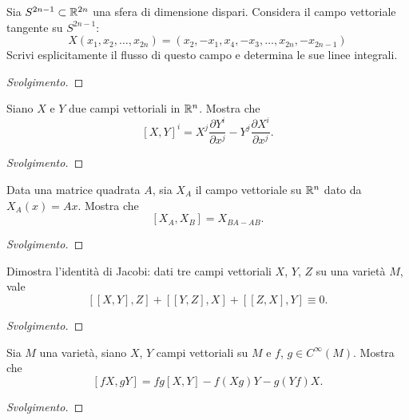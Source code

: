 \documentclass[a4paper, 12pt, italian]{article}
\begin{document}
\begin{exercise}
Sia $S^{2n - 1} \subset \mathbb{R}^{2n}$ una sfera di dimensione dispari. Considera il
campo vettoriale tangente su $S^{2n - 1}$:
\[
X(x_1, x_2, \ldots, x_{2n}) =
\left(x_2, -x_1, x_4, -x_3, \ldots, x_{2n}, -x_{2n - 1}\right)
\] 
Scrivi esplicitamente il flusso di questo campo e determina le sue linee
integrali.
\begin{proof}[Svolgimento]
    
\end{proof}
\end{exercise}

\begin{exercise}
Siano $X$ e $Y$ due campi vettoriali in $\mathbb{R}^n$. Mostra che
\[
[X, Y]^i = X^j \frac{\partial Y^i}{\partial x^j} -
Y^j \frac{\partial X^i}{\partial x^j}
.\] 
\begin{proof}[Svolgimento]
    
\end{proof}
\end{exercise}

\begin{exercise}
Data una matrice quadrata $A$, sia $X_A$ il campo vettoriale su $\mathbb{R}^n$ dato da
$X_A(x) = Ax$. Mostra che
\[
[X_A, X_B] = X_{BA - AB}
.\] 
\begin{proof}[Svolgimento]
    
\end{proof}
\end{exercise}

\begin{exercise}
Dimostra l'identità di Jacobi: dati tre campi vettoriali $X$, $Y$, $Z$ su
una varietà $M$, vale
\[
[[X, Y], Z] + [[Y, Z], X] + [[Z, X], Y] \equiv 0
.\] 
\begin{proof}[Svolgimento]
    
\end{proof}
\end{exercise}

\begin{exercise}
Sia $M$ una varietà, siano $X$, $Y$ campi vettoriali su $M$ e $f$,
$g \in C^\infty (M)$. Mostra che
\[
[fX, gY] = fg[X, Y] - f(Xg)Y - g(Yf)X
.\] 
\begin{proof}[Svolgimento]
    
\end{proof}
\end{exercise}
\end{document}

